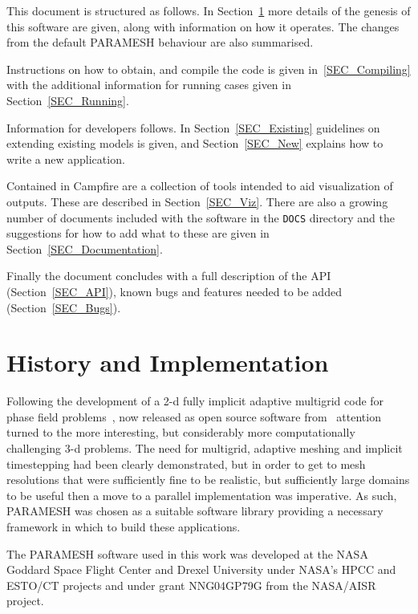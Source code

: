 \documentclass[paper=a4, fontsize=11pt,twoside,bibtotoc]{scrartcl}		%
\begin{document}
This document is structured as follows.  In Section~\ref{SEC_History} more details of the genesis of this software are given, along with information on how it 
operates.  The changes from the default PARAMESH behaviour are also summarised.

Instructions on how to obtain, and compile the code is given in~\ref{SEC_Compiling} with the additional information for running cases given in 
Section~\ref{SEC_Running}. 

Information for developers follows.  In Section~\ref{SEC_Existing} guidelines on extending existing models is given, and Section~\ref{SEC_New} explains how to 
write a new application.

Contained in Campfire are a collection  of tools intended to aid visualization of outputs.  These are described in Section~\ref{SEC_Viz}.  There are also a 
growing number of documents included with the software in the \texttt{DOCS} directory and the suggestions for how to add what to these are given 
in Section~\ref{SEC_Documentation}.

Finally the document concludes with a full description of the API (Section~\ref{SEC_API}), known bugs and features needed to be added (Section~\ref{SEC_Bugs}).


\section{History and Implementation}	
								\label{SEC_History}

Following the development of a 2-d fully implicit adaptive multigrid code for phase field problems~\cite{janref1,janref2,janref3}, now released as open source 
software from~\cite{jancode} attention turned to the more interesting, but considerably more computationally challenging 3-d problems.  The need for multigrid, 
adaptive meshing and implicit timestepping had been clearly demonstrated, but in order to get to mesh resolutions that were sufficiently fine to be realistic, but 
sufficiently large domains to be useful then a move to a parallel implementation was imperative.  As such, PARAMESH was chosen as a suitable software library 
providing a necessary framework in which to build these applications.

The PARAMESH software used in this work was developed at the NASA Goddard Space Flight Center and Drexel University under NASA's HPCC and ESTO/CT projects and 
under grant NNG04GP79G from the NASA/AISR project.
\end{document}
